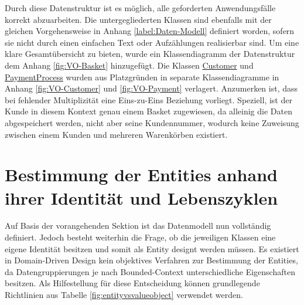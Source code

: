 \vspace{1em}

Durch diese Datenstruktur ist es möglich, alle geforderten Anwendungsfälle korrekt abzuarbeiten. Die untergegliederten Klassen sind ebenfalls mit der gleichen Vorgehensweise in Anhang \ref{label:Daten-Modell} definiert worden, sofern sie nicht durch einen einfachen Text oder Aufzählungen realisierbar sind. Um eine klare Gesamtübersicht zu bieten, wurde ein Klassendiagramm der Datenstruktur dem Anhang \ref{fig:VO-Basket} hinzugefügt. Die Klassen \ul{Customer} und \ul{PaymentProcess} wurden aus Platzgründen in separate Klassendiagramme in Anhang \ref{fig:VO-Customer} und \ref{fig:VO-Payment} verlagert. Anzumerken ist, dass bei fehlender Multiplizität eine Eins-zu-Eins Beziehung vorliegt. Speziell, ist der Kunde in diesem Kontext genau einem Basket zugewiesen, da alleinig die Daten abgespeichert werden, nicht aber seine Kundennummer, wodurch keine Zuweisung zwischen einem Kunden und mehreren Warenkörben existiert.

\section{Bestimmung der Entities anhand ihrer Identität und Lebenszyklen}

Auf Basis der vorangehenden Sektion ist das Datenmodell nun vollständig definiert. Jedoch besteht weiterhin die Frage, ob die jeweiligen Klassen eine eigene Identität besitzen und somit als Entity designt werden müssen. Es existiert in Domain-Driven Design kein objektives Verfahren zur Bestimmung der Entities, da Datengruppierungen je nach Bounded-Context unterschiedliche Eigenschaften besitzen. Als Hilfestellung für diese Entscheidung können grundlegende Richtlinien aus Tabelle \ref{fig:entityvsvalueobject} verwendet werden.


